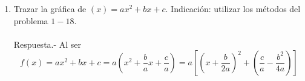 \begin{enumerate}[\bfseries 1.]
    \item Trazar la gráfica de $(x)=ax^2+bx+c$. Indicación: utilizar los métodos del problema $1-18$.\\\\
	Respuesta.-\; Al ser $$f(x)=ax^2+bx+c=a\left( x^2 + \dfrac{b}{a}x + \dfrac{c}{a} \right) = a \left[ \left( x + \dfrac{b}{2a} \right)^2 + \left( \dfrac{c}{a} - \dfrac{b^2}{4a} \right)  \right]$$ 
	\begin{center}
	\end{center}
	\vspace{0.5cm}


\end{enumerate}
